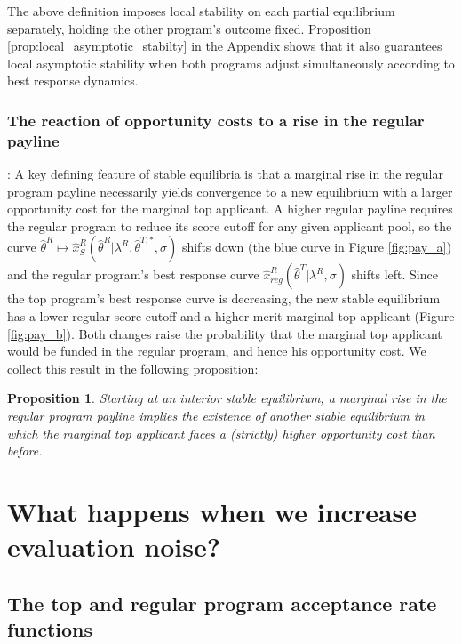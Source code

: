 \documentclass[12pt,reqno]{amsart}
\newtheorem{proposition}{Proposition}
\theoremstyle{definition}
\theoremstyle{plain} %
\begin{document}
\noindent The above definition imposes local stability on each partial equilibrium separately, holding the other program's outcome fixed. Proposition \ref{prop:local_asymptotic_stabilty} in the Appendix shows that it also guarantees local asymptotic stability when both programs adjust simultaneously according to best response dynamics.

% 

\subsubsection{The reaction of opportunity costs to a rise in the regular payline}: A key defining feature of stable equilibria is that a marginal rise in the regular program payline necessarily yields convergence to a new equilibrium with a larger opportunity cost for the marginal top applicant. A higher regular payline requires the regular program to reduce its score cutoff for any given applicant pool, so the curve $\hat{\theta}^R\mapsto \hat{x}^R_S(\hat{\theta}^R|\lambda^R,\hat{\theta}^{T,*}, \sigma)$ shifts down (the blue curve in Figure \ref{fig:pay_a}) and the regular program's best response curve $\hat{x}^R_{reg}(\hat{\theta}^T|\lambda^R,\sigma)$ shifts left. Since the top program's best response curve is decreasing, the new stable equilibrium has a lower regular score cutoff and a higher-merit marginal top applicant (Figure \ref{fig:pay_b}). Both changes raise the probability that the marginal top applicant would be funded in the regular program, and hence his opportunity cost. We collect this result in the following proposition:

\begin{proposition}\label{prop:stable_higherpayline_oc}
Starting at an interior stable equilibrium, a marginal rise in the regular program payline implies the existence of another stable equilibrium in which the marginal top applicant faces a (strictly) higher opportunity cost than before. 
\end{proposition}



\section{What happens when we increase evaluation noise?}\label{section:increase_noise}

\subsection{The top and regular program acceptance rate functions}
\end{document}
